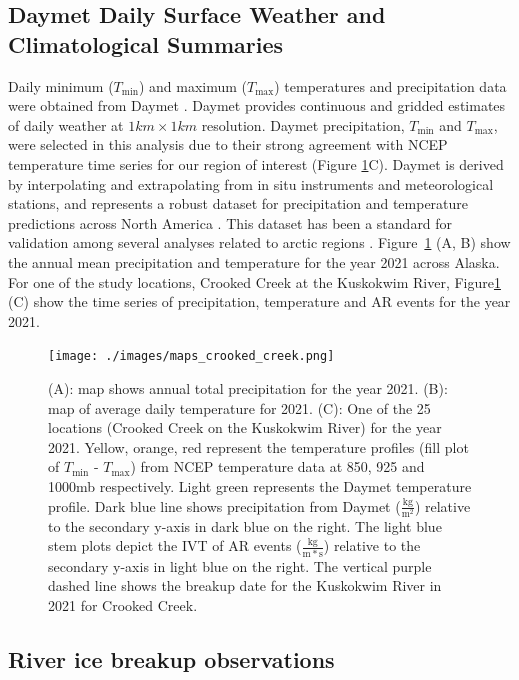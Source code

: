 \documentclass[12pts,draft]{AR_analysis_}
\begin{document}
\subsection{Daymet Daily Surface Weather and Climatological Summaries}

Daily minimum ($T_{\text{min}}$) and maximum ($T_{\text{max}}$) temperatures and 
precipitation data were obtained from Daymet \cite{Daymet}. 
Daymet provides continuous and gridded estimates of daily weather at
$1km \times 1km$ resolution.  Daymet precipitation, 
$T_{\text{min}}$ and $T_{\text{max}}$, were selected in this analysis
due to their strong agreement with NCEP temperature time series for our 
region of interest (Figure \ref{fig:maps_crooked_creek}C). 
Daymet is derived by interpolating and extrapolating from in situ instruments 
and meteorological stations, and represents a robust 
dataset for precipitation and temperature predictions across North
America \cite{daymet2021}. This dataset has been a standard for validation 
among several analyses related to arctic regions \cite{Diro2019, 
Akinsanola2024}. Figure~\ref{fig:maps_crooked_creek}
(A, B) show the annual mean precipitation and temperature for the year
2021 across Alaska. For one of the study locations, Crooked Creek at the
Kuskokwim River, Figure\ref{fig:maps_crooked_creek} (C)
show the time series of precipitation, temperature and AR events for the
year 2021. 

\begin{figure}
\centering
\texttt{[image: ./images/maps\_crooked\_creek.png]}
	\caption{(A): map shows annual total precipitation for the
	year 2021. (B): map of average daily temperature for 2021. (C):
	One of the 25 locations (Crooked Creek on the Kuskokwim
	River) for the year 2021. Yellow, orange, red represent the
	temperature profiles (fill plot of $T_{\text{min}}$ -
	$T_{\text{max}}$) from NCEP
	temperature data at 850, 925 and 1000mb respectively. Light
	green represents the Daymet temperature profile. Dark blue line shows
	precipitation from Daymet ($\mathrm{\frac{kg}{m^{2}}}$) 
	relative to the secondary y-axis in dark blue
	on the right. The light blue stem
	plots depict the IVT of AR events ($\mathrm{\frac{kg}{m*s}}$) 
	relative to the secondary y-axis in light blue
	on the right. The vertical purple dashed line shows the breakup
	date for the Kuskokwim River in 2021 for Crooked Creek.}
\label{fig:maps_crooked_creek} 
\end{figure}

\subsection{River ice breakup observations}
\end{document}

